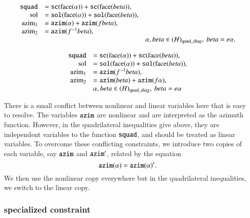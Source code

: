 \begin{equation}
\begin{array}{rll}
    {\operatorname{{\texttt{squad}}}} &={\operatorname{{\texttt{sc}}}}({\operatorname{face}}(\alpha))+{\operatorname{{\texttt{sc}}}}({\operatorname{face}}(beta)),\\
    {\operatorname{sol}} &= {\operatorname{{\texttt{sol}}}}({\operatorname{face}}(\alpha))+{\operatorname{{\texttt{sol}}}}({\operatorname{face}}(beta)),\\
    {\operatorname{azim}}_1 &={\operatorname{{\texttt{azim}}}}(\alpha)+{\operatorname{{\texttt{azim}}}}(fbeta),\\
     {\operatorname{azim}}_2 &= {\operatorname{{\texttt{azim}}}}(f^{-1}beta),
         \\
    &&\alpha,beta \in (H)_{{\operatorname{quad\_diag}}},\ beta=e\alpha.\\
\end{array}
\end{equation}

\begin{equation}
\begin{array}{rll}
    {\operatorname{{\texttt{squad}}}} &={\operatorname{{\texttt{sc}}}}({\operatorname{face}}(\alpha))+{\operatorname{{\texttt{sc}}}}({\operatorname{face}}(beta)),\\
    {\operatorname{sol}} &= {\operatorname{{\texttt{sol}}}}({\operatorname{face}}(\alpha))+{\operatorname{{\texttt{sol}}}}({\operatorname{face}}(beta)),\\
    {\operatorname{azim}}_1 &={\operatorname{{\texttt{azim}}}}(f^{-1}beta),\\
     {\operatorname{azim}}_2 &= {\operatorname{{\texttt{azim}}}}(beta)+{\operatorname{{\texttt{azim}}}}(f\alpha),
         \\
    &\alpha,beta \in (H)_{{\operatorname{quad\_diag}}},\ beta=e\alpha\\
\end{array}
\end{equation}

\begin{remark}  There is a small conflict between nonlinear and
linear variables here that is easy to resolve.  The variables
${\operatorname{{\texttt{azim}}}}$ are nonlinear and are interpreted as the azimuth
function.  However, in the quadrilateral inequalities give above,
they are independent variables to the function ${\operatorname{{\texttt{squad}}}}$, and
should be treated as linear variables.  To overcome these
conflicting constraints, we introduce two copies of each variable,
say ${\operatorname{{\texttt{azim}}}}$ and ${\operatorname{{\texttt{azim}}}}'$, related by the equation
    $$
    {\operatorname{{\texttt{azim}}}}(\alpha) = {\operatorname{{\texttt{azim}}}}(\alpha)'.
    $$
We then use the nonlinear copy everywhere but in the quadrilateral
inequalities, we switch to the linear copy.
\end{remark}

\subsubsection{specialized  constraint}



